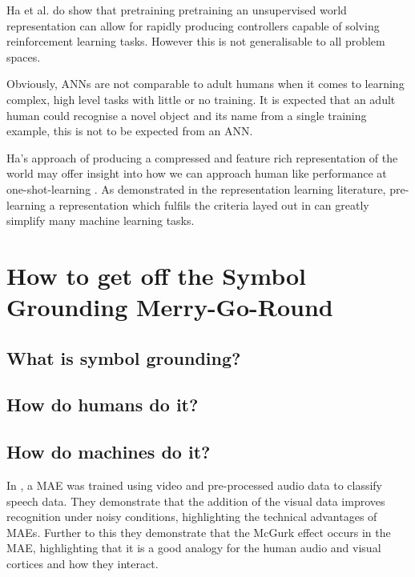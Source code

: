 Ha et al. \cite{ha2018world, ha2018recurrent} do show that pretraining pretraining an unsupervised world representation can allow for rapidly producing controllers capable of solving reinforcement learning tasks. However this is not generalisable to all problem spaces.

Obviously, \ac{ANN}s are not comparable to adult humans when it comes to learning complex, high level tasks with little or no training. It is expected that an adult human could recognise a novel object and its name from a single training example, this is not to be expected from an \ac{ANN}.

Ha's approach of producing a compressed and feature rich representation of the world \cite{ha2018world, ha2018recurrent} may offer insight into how we can approach human like performance at one-shot-learning \cite{vinyals2016matching}. As demonstrated in the representation learning literature, pre-learning a representation which fulfils the criteria layed out in \cite{repRev} can greatly simplify many machine learning tasks.


\section{How to get off the Symbol Grounding Merry-Go-Round} 
\subsection{What is symbol grounding?}
\cite{searle1980minds, steels2008symbol}
\subsection{How do humans do it?}
\cite{barsalou2008grounded}

\subsection{How do machines do it?}
\cite{coradeschi2000anchoring, coradeschi2003introduction, pezzulo2013computational, cangelosi2001adaptive, cangelosi2002symbol}

In \cite{ngiam2011multimodal}, a MAE was trained using video and pre-processed audio data to classify speech data. They demonstrate that the addition of the visual data improves recognition under noisy conditions, highlighting the technical advantages of MAEs. Further to this they demonstrate that the McGurk effect \cite{mcgurk1976hearing} occurs in the MAE, highlighting that it is a good analogy for the human audio and visual cortices and how they interact.

